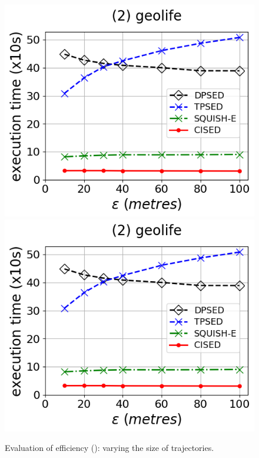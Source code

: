 \begin{figure}[tb!]
	\includegraphics[scale=0.315]{Figures/Exp-time-epsilon-geolife.png}	\hspace{1ex}
	\includegraphics[scale=0.315]{Figures/Exp-time-epsilon-geolife.png}	\hspace{1ex}
	\vspace{-2.5ex}
	\caption{\small Evaluation of efficiency (\ped): varying the size of trajectories.}\label{fig:time-size-ped}
	\vspace{-1ex}
\end{figure}


